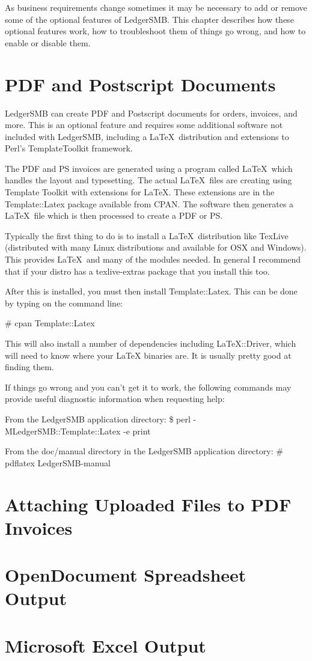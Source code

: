 As business requirements change sometimes it may be necessary to add or remove
some of the optional features of LedgerSMB.  This chapter describes how these
optional features work, how to troubleshoot them of things go wrong, and how to
enable or disable them.

\section{PDF and Postscript Documents}
\label{sec-options-pdf}

LedgerSMB can create PDF and Postscript documents for orders, invoices, and
more.  This is an optional feature and requires some additional software not
included with LedgerSMB, including a \LaTeX\ distribution and extensions to 
Perl's TemplateToolkit framework.

The PDF and PS invoices are generated using a program called \LaTeX\
which handles the layout and typesetting.  The actual \LaTeX\ files are
creating using Template Toolkit with extensions for \LaTeX.  These
extensions are in the Template::Latex package available from CPAN.
The software then generates a \LaTeX\ file which is then processed to
create a PDF or PS.

Typically the first thing to do is to install a \LaTeX\ distribution
like TexLive (distributed with many Linux distributions and available
for OSX and Windows).  This provides \LaTeX\ and many of the modules
needed.   In general I recommend that if your distro has a
texlive-extras package that you install this too.

After this is installed, you must then install Template::Latex.  This
can be done by typing on the command line:

\# cpan Template::Latex

This will also install a number of dependencies including
LaTeX::Driver, which will need to know where your LaTeX binaries are.
It is usually pretty good at finding them.

If things go wrong and you can't get it to work, the following
commands may provide useful diagnostic information when requesting
help:

From the LedgerSMB application directory:
\$ perl -MLedgerSMB::Template::Latex -e print

From the doc/manual directory in the LedgerSMB application directory:
\# pdflatex LedgerSMB-manual

\section{Attaching Uploaded Files to PDF Invoices}
\label{sec-options-uploaded-files-invoices}

\section{OpenDocument Spreadsheet Output}
\label{sec-options-ODS-spreadsheet-output}


\section{Microsoft Excel Output}
\label{sec-options-XLS-spreadsheet-output}


